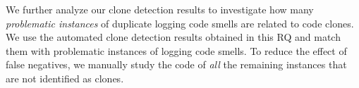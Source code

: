 We further analyze our clone detection results to investigate how many {\em problematic instances} of duplicate logging code smells are related to code clones. We use the automated clone detection results obtained in this RQ and match them with problematic instances of logging code smells. To reduce the effect of false negatives, we manually study the code of {\em all} the remaining instances that are not identified as clones. %


